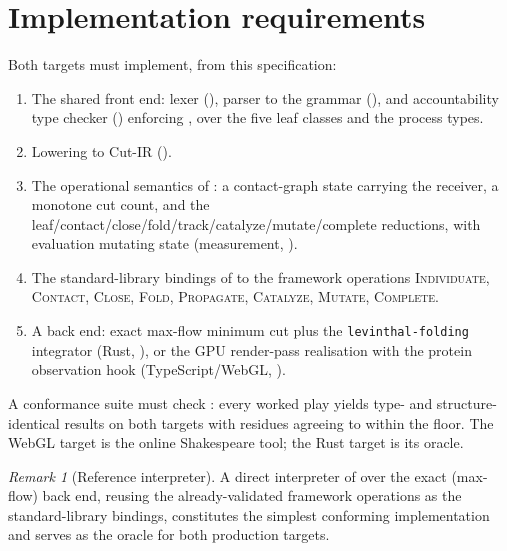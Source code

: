 \documentclass[11pt,a4paper]{article}
\theoremstyle{thmstyle}
\theoremstyle{definition}
\theoremstyle{remark}
\newtheorem{remark}[theorem]{Remark}
\newcommand{\shk}[1]{\texttt{#1}}
\begin{document}
\section{Implementation requirements}
\label{sec:impl}

Both targets must implement, from this specification:

\begin{enumerate}[leftmargin=1.6em,itemsep=2pt]
\item The shared front end: lexer (), parser to the
grammar (), and accountability type checker
() enforcing , over the five leaf
classes and the process types.
\item Lowering to Cut-IR ().
\item The operational semantics of : a contact-graph state
carrying the receiver, a monotone cut count, and the
leaf/contact/close/fold/track/catalyze/mutate/complete reductions, with
evaluation mutating state (measurement, ).
\item The standard-library bindings of  to the framework
operations \textsc{Individuate}, \textsc{Contact}, \textsc{Close},
\textsc{Fold}, \textsc{Propagate}, \textsc{Catalyze}, \textsc{Mutate},
\textsc{Complete}.
\item A back end: exact max-flow minimum cut plus the \shk{levinthal-folding}
integrator (Rust, ), or the GPU render-pass
realisation with the protein observation hook (TypeScript/WebGL,
).
\end{enumerate}

A conformance suite must check : every worked play
yields type- and structure-identical results on both targets with residues
agreeing to within the floor. The WebGL target is the online Shakespeare
tool; the Rust target is its oracle.

\begin{remark}[Reference interpreter]
\label{rem:reference}
A direct interpreter of  over the exact (max-flow) back end,
reusing the already-validated framework operations as the standard-library
bindings, constitutes the simplest conforming implementation and serves as
the oracle for both production targets.
\end{remark}
\end{document}
